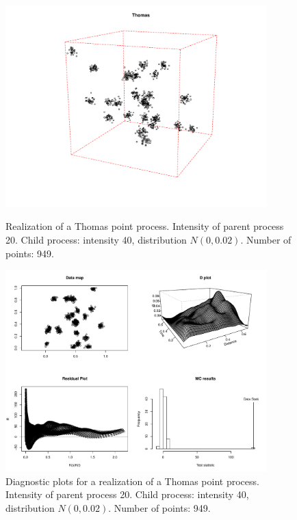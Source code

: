 \documentclass{article}
\begin{document}
\begin{figure}[p]
  \centering
    \includegraphics[width=0.9\textwidth]{PP_Thomas_20_40_0p02_949.pdf}
  \caption{Realization of a Thomas point process. Intensity of parent process 20. Child process: intensity 40, distribution $N(0,0.02)$. Number of points: 949.}
  \label{fig:thomasPP}

\vspace*{\floatsep}

    \includegraphics[width=0.9\textwidth]{diag_Thomas_20_40_0p02_949.pdf}
  \caption{Diagnostic plots for a realization of a Thomas point process. Intensity of parent process 20. Child process: intensity 40, distribution $N(0,0.02)$. Number of points: 949.}
  \label{fig:thomasDiag}
\end{figure}
\end{document}
